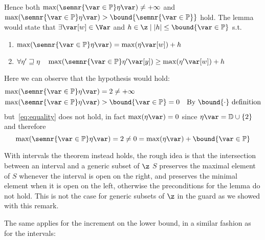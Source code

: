 \begin{remark}
  \noindent
  Hence both
  \(\max({\semnr{\var\in\mathbb{P}}\eta\var}) \neq +\infty\) and
  \(\max({\semnr{\var\in\mathbb{P}}\eta\var}) >
  \bound{\semnr{\var\in\mathbb{P}}}\) hold. The lemma would state that
  \(\exists \var[w] \in \Var\) and
  \(h \in \z \mid |h| \leq \bound{\var\in\mathbb{P}}\) s.t.
  \begin{enumerate}[label=(\roman*)]
  \item\label{eq:equality}
    \(\max(\semnr{\var\in \mathbb{P}}\eta\var) = \max(\eta\var[w]) + h\)
  \item
    \(\forall \eta'\sqsupseteq \eta \quad
    \max(\semnr{\var\in\mathbb{P}}\eta'\var[y]) \geq
    \max(\eta'\var[w]) + h\)
  \end{enumerate}
  Here we can observe that the hypothesis would hold:
  \begin{align*}
    \max(\semnr{\var\in\mathbb{P}}\eta\var) & = 2 \neq +\infty \\
    \max(\semnr{\var\in\mathbb{P}}\eta\var) & > \bound{\var\in\mathbb{P}} = 0 & \text{By }\bound{\cdot} \text{ definition}
  \end{align*}
  but~\ref{eq:equality} does not hold, in fact \(\max(\eta\var) = 0\)
  since \(\eta\var = \mathbb{D} \cup \{2\}\) and therefore
  \begin{equation*}
    \max(\semnr{\var\in\mathbb{P}}\eta\var) = 2 \neq 0 = \max(\eta\var) + \bound{\var\in\mathbb{P}}
  \end{equation*}

  With intervals the theorem instead holds, the rough idea is that the
  intersection between an interval and a generic subset of \(\z\)
  \(S\) preserves the maximal element of \(S\) whenever the interval
  is open on the right, and preserves the minimal element when it is
  open on the left, otherwise the preconditions for the lemma do not
  hold. This is not the case for generic subsets of \(\z\) in the
  guard as we showed with this remark.
\end{remark}

The same applies for the increment on the lower bound, in a similar
fashion as for the intervals:

